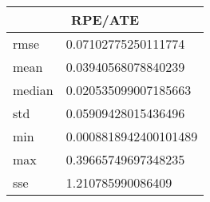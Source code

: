 \begin{table}[!ht] 
 \centering 
 \begin{tabular}{|l|l|} \hline 
 \multicolumn{2}{|c|}{RPE/ATE} \\ \hline 
 rmse & 0.07102775250111774 \\ \hline 
mean & 0.03940568078840239 \\ \hline 
median & 0.020535099007185663 \\ \hline 
std & 0.05909428015436496 \\ \hline 
min & 0.0008818942400101489 \\ \hline 
max & 0.39665749697348235 \\ \hline 
sse & 1.210785990086409 \\ \hline 
\end{tabular} 
 \end{table}